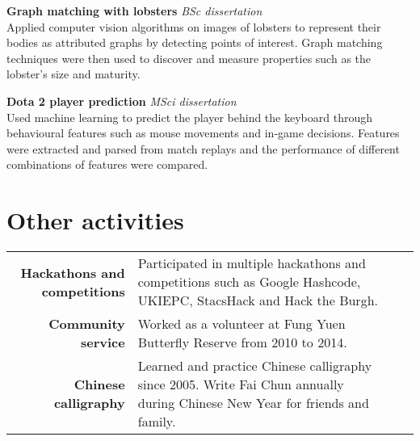 \documentclass{article}
\newcommand{\n}[0]{\\[\baselineskip]}
\begin{document}



\textbf{Graph matching with lobsters} \textit{BSc dissertation} \\
Applied computer vision algorithms on images of lobsters to represent their bodies as attributed graphs by detecting points of interest. Graph matching techniques were then used to discover and measure properties such as the lobster's size and maturity.

\textbf{Dota 2 player prediction} \textit{MSci dissertation} \\
Used machine learning to predict the player behind the keyboard through behavioural features such as mouse movements and in-game decisions. Features were extracted and parsed from match replays and the performance of different combinations of features were compared.


\section*{Other activities}
\begin{tabular}{R|p{15cm}}
\textbf{Hackathons and competitions} & Participated in multiple hackathons and competitions such as Google Hashcode, UKIEPC, StacsHack and Hack the Burgh. \n

\textbf{Community service} & Worked as a volunteer at Fung Yuen Butterfly Reserve from 2010 to 2014. \n

\textbf{Chinese calligraphy} & Learned and practice Chinese calligraphy since 2005. Write Fai Chun annually during Chinese New Year for friends and family. 
\end{tabular}
\end{document}
